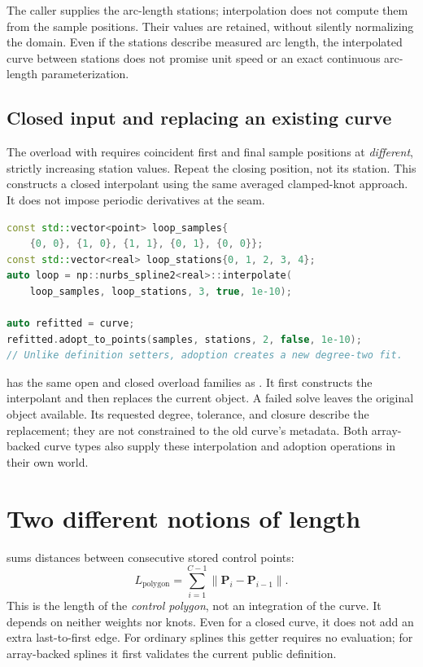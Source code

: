 \begin{manualnote}
The caller supplies the arc-length stations; interpolation does not compute
them from the sample positions. Their values are retained, without silently
normalizing the domain. Even if the stations describe measured arc length,
the interpolated curve between stations does not promise unit speed or an
exact continuous arc-length parameterization.
\end{manualnote}

\subsection{Closed input and replacing an existing curve}

The overload with  requires coincident first and final sample
positions at \emph{different}, strictly increasing station values. Repeat
the closing position, not its station. This constructs a closed interpolant
using the same averaged clamped-knot approach. It does not impose periodic
derivatives at the seam.

\begin{lstlisting}[language=C++,caption={Closed interpolation and adopting a new sample set.}]
const std::vector<point> loop_samples{
    {0, 0}, {1, 0}, {1, 1}, {0, 1}, {0, 0}};
const std::vector<real> loop_stations{0, 1, 2, 3, 4};
auto loop = np::nurbs_spline2<real>::interpolate(
    loop_samples, loop_stations, 3, true, 1e-10);

auto refitted = curve;
refitted.adopt_to_points(samples, stations, 2, false, 1e-10);
// Unlike definition setters, adoption creates a new degree-two fit.
\end{lstlisting}

 has the same open and closed overload families as
. It first constructs the interpolant and then replaces the
current object. A failed solve leaves the original object available. Its
requested degree, tolerance, and closure describe the replacement; they are
not constrained to the old curve's metadata. Both array-backed curve types
also supply these interpolation and adoption operations in their own world.

\section{Two different notions of length}

 sums distances between consecutive stored control
points:
\begin{equation}
 L_\mathrm{polygon}=\sum_{i=1}^{C-1}\|\mathbf P_i-\mathbf P_{i-1}\|.
\end{equation}
This is the length of the \emph{control polygon}, not an integration of the
curve. It depends on neither weights nor knots. Even for a closed curve, it
does not add an extra last-to-first edge. For ordinary splines this getter
requires no evaluation; for array-backed splines it first validates the
current public definition.

